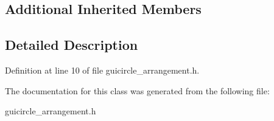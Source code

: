 \subsection*{Additional Inherited Members}


\subsection{Detailed Description}


Definition at line 10 of file guicircle\+\_\+arrangement.\+h.



The documentation for this class was generated from the following file\+:\begin{DoxyCompactItemize}
\item 
guicircle\+\_\+arrangement.\+h\end{DoxyCompactItemize}
